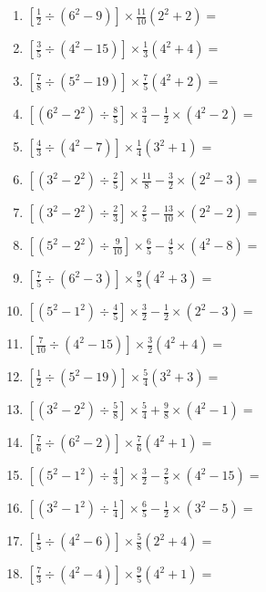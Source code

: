 \documentclass[12pt]{article}
\begin{document}
\begin{enumerate}[ itemsep=1.5cm]
	\item $\displaystyle \left[ \frac{1}{2} \div \left( 6^2 - 9 \right) \right] \times \frac{11}{10} \left( 2^2 + 2 \right) =$
	\item $\displaystyle \left[ \frac{3}{5} \div \left( 4^2 - 15 \right) \right] \times \frac{1}{3} \left( 4^2 + 4 \right) =$
	\item $\displaystyle \left[ \frac{7}{8} \div \left( 5^2 - 19 \right) \right] \times \frac{7}{5} \left( 4^2 + 2 \right) =$
	\item $\displaystyle \left[ \left( 6^2 - 2^2 \right) \div \frac{8}{5} \right] \times \frac{3}{4} - \frac{1}{2} \times \left( 4^2 - 2 \right) =$
	\item $\displaystyle \left[ \frac{4}{3} \div \left( 4^2 - 7 \right) \right] \times \frac{1}{4} \left( 3^2 + 1 \right) =$
	\item $\displaystyle \left[ \left( 3^2 - 2^2 \right) \div \frac{2}{5} \right] \times \frac{11}{8} - \frac{3}{2} \times \left( 2^2 - 3 \right) =$
	\item $\displaystyle \left[ \left( 3^2 - 2^2 \right) \div \frac{2}{3} \right] \times \frac{2}{5} - \frac{13}{10} \times \left( 2^2 - 2 \right) =$
	\item $\displaystyle \left[ \left( 5^2 - 2^2 \right) \div \frac{9}{10} \right] \times \frac{6}{5} - \frac{4}{5} \times \left( 4^2 - 8 \right) =$
	\item $\displaystyle \left[ \frac{7}{5} \div \left( 6^2 - 3 \right) \right] \times \frac{9}{5} \left( 4^2 + 3 \right) =$

	\item $\displaystyle \left[ \left( 5^2 - 1^2 \right) \div \frac{4}{5} \right] \times \frac{3}{2} - \frac{1}{2} \times \left( 2^2 - 3 \right) =$
	\item $\displaystyle \left[ \frac{7}{10} \div \left( 4^2 - 15 \right) \right] \times \frac{3}{2} \left( 4^2 + 4 \right) =$
	\item $\displaystyle \left[ \frac{1}{2} \div \left( 5^2 - 19 \right) \right] \times \frac{5}{4} \left( 3^2 + 3 \right) =$
	\item $\displaystyle \left[ \left( 3^2 - 2^2 \right) \div \frac{5}{8} \right] \times \frac{5}{4} + \frac{9}{8} \times \left( 4^2 - 1 \right) =$
	\item $\displaystyle \left[ \frac{7}{6} \div \left( 6^2 - 2 \right) \right] \times \frac{7}{6} \left( 4^2 + 1 \right) =$
	\item $\displaystyle \left[ \left( 5^2 - 1^2 \right) \div \frac{4}{3} \right] \times \frac{3}{2} - \frac{2}{5} \times \left( 4^2 - 15 \right) =$
	\item $\displaystyle \left[ \left( 3^2 - 1^2 \right) \div \frac{1}{4} \right] \times \frac{6}{5} - \frac{1}{2} \times \left( 3^2 - 5 \right) =$
	\item $\displaystyle \left[ \frac{1}{5} \div \left( 4^2 - 6 \right) \right] \times \frac{5}{8} \left( 2^2 + 4 \right) =$
	\item $\displaystyle \left[ \frac{7}{3} \div \left( 4^2 - 4 \right) \right] \times \frac{9}{5} \left( 4^2 + 1 \right) =$


\end{enumerate}
\end{document}
